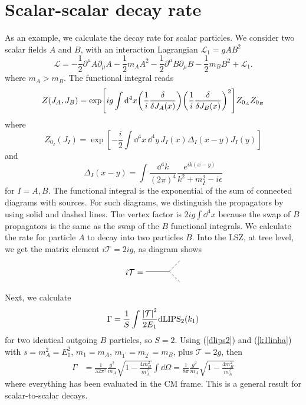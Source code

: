 \section{Scalar-scalar decay rate}
As an example, we calculate the decay rate for scalar particles. We consider two scalar fields $A$ and $B$, with an interaction Lagrangian $\mathcal{L}_1=gAB^2$
\begin{equation}
    \mathcal{L}=-\frac{1}{2}\partial^\mu A\partial_\mu A - \frac{1}{2}m_A A^2-\frac{1}{2}\partial^\mu B\partial_\mu B - \frac{1}{2}m_B B^2+\mathcal{L}_1.
\end{equation}
where $m_A>m_B$. The functional integral reads
\begin{equation}
    Z(J_A,J_B)=\exp[ig\int\dd^4 x\qty(\frac{1}{i}\fdv{J_A(x)})\qty(\frac{1}{i}\fdv{J_B(x)})^2]Z_{0_A}Z_{0_B}
\end{equation}
where 
\begin{equation}
    Z_{0_I}(J_I)=\exp[-\frac{i}{2}\int\dd^4x\,\dd^4y\, J_I(x)\Delta_I(x-y)J_I(y)]
\end{equation}
and 
\begin{equation}
    \Delta_I(x-y)=\int\frac{\dd^4 k}{(2\pi)^4}\frac{e^{ik(x-y)}}{k^2+m^2_I-i\epsilon}
\end{equation}
for $I=A,B$. The functional integral is the exponential of the sum of connected diagrams with sources. For such diagrams, we distinguish the propagators by using solid and dashed lines. The vertex factor is $2ig\int\dd^4 x$  because the swap of $B$ propagators is the same as the swap of the $B$ functional integrals. We calculate the rate for particle $A$ to decay into two particles $B$. Into the LSZ, at tree level, we get the matrix element $i\mathcal{T}=2ig$, as diagram shows
\begin{equation}
\begin{aligned}
i\mathcal{T}=
\begin{gathered}
    \begin{tikzpicture}
    \draw (0,0) -- (1,0);
    \draw[densely dashed] (1,0)--(1.5,0.5);
    \draw[densely dashed] (1,0)--(1.5,-0.5);
    \end{tikzpicture}
\end{gathered}
\end{aligned}
\end{equation}
Next, we calculate 
\begin{equation}
    \Gamma=\frac{1}{S}\int\frac{\abs{\mathcal{T}}^2}{2E_1}\dd\text{LIPS}_2(k_1)
\end{equation}
for two identical outgoing $B$ particles, so $S=2$. Using (\ref{dlips2}) and (\ref{k1linha}) with $s=m_A^2=E_1^2$, $m_1=m_A$, $m_{1^\prime}=m_{2^\prime}=m_B$, plus $\mathcal{T}=2g$, then
\begin{equation}
    \begin{aligned}
    \Gamma&=\frac{1}{32\pi^2}\frac{g^2}{m_A}\sqrt{1-\frac{4m_B^2}{m_A^2}}\int\dd\Omega=\frac{1}{8\pi}\frac{g^2}{m_A}\sqrt{1-\frac{4m_B^2}{m_A^2}}
    \end{aligned}
\end{equation}
where everything has been evaluated in the CM frame. This is a general result for scalar-to-scalar decays.